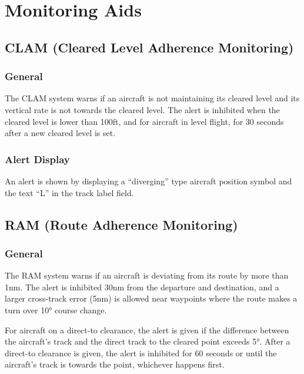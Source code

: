 \documentclass[a4paper,oneside,11pt]{memoir}
\begin{document}
\section{Monitoring Aids}


\subsection{CLAM (Cleared Level Adherence Monitoring)}
\label{tool:CLAM}
\subsubsection*{General}

The CLAM system warns if an aircraft is not maintaining its cleared level and its vertical rate is not towards the cleared level. The alert is inhibited when the cleared level is lower than 100ft, and for aircraft in level flight, for 30 seconds after a new cleared level is set.

\subsubsection*{Alert Display}

An alert is shown by displaying a “diverging” type aircraft position symbol and the text “L” in the  track label field.

\subsection{RAM (Route Adherence Monitoring)}
\label{tool:RAM}
\subsubsection*{General}

The RAM system warns if an aircraft is deviating from its route by more than 1nm. The alert is inhibited 30nm from the departure and destination, and a larger cross-track error (5nm) is allowed near waypoints where the route makes a turn over 10° course change.

\bigskip

For aircraft on a direct-to clearance, the alert is given if the difference between the aircraft’s track and the direct track to the cleared point exceeds 5°. After a direct-to clearance is given, the alert is inhibited for 60 seconds or until the aircraft’s track is towards the point, whichever happens first.
\end{document}
